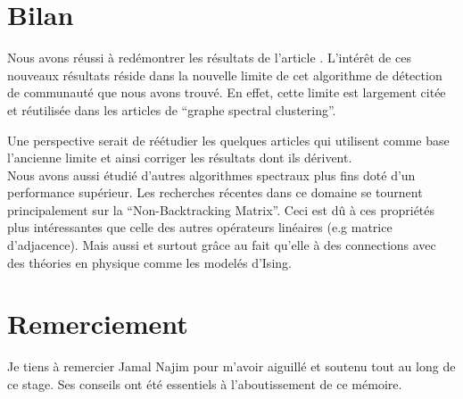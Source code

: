 \section*{Bilan}
Nous avons réussi à redémontrer les résultats de l'article \cite{raj_rao}.
L'intérêt de ces nouveaux résultats réside dans la nouvelle limite de cet algorithme de détection de communauté que nous avons trouvé.
En effet, cette limite est largement citée et réutilisée dans les articles de ``graphe spectral clustering''.

Une perspective serait de réétudier les quelques articles qui utilisent comme base l’ancienne limite et ainsi corriger les résultats dont ils dérivent.\\

Nous avons aussi étudié d'autres algorithmes spectraux plus fins doté d'un performance supérieur.
Les recherches récentes dans ce domaine se tournent principalement sur la ``Non-Backtracking Matrix''.
Ceci est dû à ces propriétés plus intéressantes que celle des autres opérateurs linéaires (e.g matrice d'adjacence).
Mais aussi et surtout grâce au fait qu'elle à des connections avec des théories en physique comme les modelés d'Ising.

\section*{Remerciement}
Je tiens à remercier Jamal Najim pour m'avoir aiguillé et soutenu tout au long de ce stage.
Ses conseils ont été essentiels à l'aboutissement de ce mémoire.